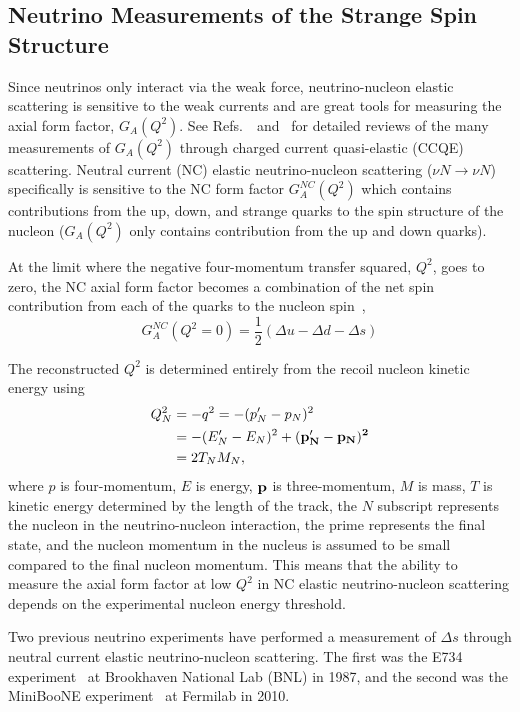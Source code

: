 \subsection{Neutrino Measurements of the Strange Spin Structure}
\label{sec:neutrinos}
  Since neutrinos only interact via the weak force, neutrino-nucleon elastic
  scattering is sensitive to the weak currents and are great tools for
  measuring the axial form factor, $G_A(Q^2)$.
  See Refs.~\cite{Lyubushkin:2008pe}~and~\cite{Formaggio:2013kya} for detailed
  reviews of the many measurements of $G_A(Q^2)$ through charged current
  quasi-elastic (CCQE) scattering. Neutral current (NC) elastic
  neutrino-nucleon scattering ($\nu N \rightarrow \nu N$) specifically is
  sensitive to the NC form factor $G_A^{NC}(Q^2)$ which contains
  contributions from the up, down, and strange quarks to the spin structure
  of the nucleon ($G_A(Q^2)$ only contains contribution from the up and down
  quarks).

  At the limit where the negative four-momentum transfer squared, $Q^2$, goes
  to zero, the NC axial form factor becomes a combination of the net spin
  contribution from each of the quarks to the nucleon spin~\cite{Bass:2007zzb},
  \begin{equation}
    G_A^{NC}(Q^2 = 0) = \frac{1}{2}(\Delta u - \Delta d - \Delta s)
  \end{equation}

  The reconstructed $Q^2$ is determined entirely from the recoil nucleon
  kinetic energy using
  \begin{equation}
    \begin{aligned}
    Q^2_N &= -q^2 = -(p'_N - p_N)^2 \\
          &= -(E'_N - E_N)^2 + (\bf{p}'_N - \bf{p}_N)^2 \\
          &= 2 T_N M_N,
    \end{aligned}
  \end{equation}
  where $p$ is four-momentum, $E$ is energy, $\bf{p}$ is three-momentum, $M$ is
  mass, $T$ is kinetic energy determined by the length of the track, the $N$
  subscript represents the nucleon in the neutrino-nucleon interaction, the
  prime represents the final state, and the nucleon momentum in the nucleus is
  assumed to be small compared to the final nucleon momentum. This means that
  the ability to measure the axial form factor at low $Q^2$ in NC elastic
  neutrino-nucleon scattering depends on the experimental nucleon energy
  threshold.

  Two previous neutrino experiments have performed a measurement of $\Delta
  s$ through neutral current elastic neutrino-nucleon scattering. The first
  was the E734 experiment~\cite{Ahrens:1986xe} at Brookhaven National Lab (BNL) in
  1987, and the second was the MiniBooNE experiment~\cite{Aguilar-Arevalo:2010cx} at
  Fermilab in 2010.

